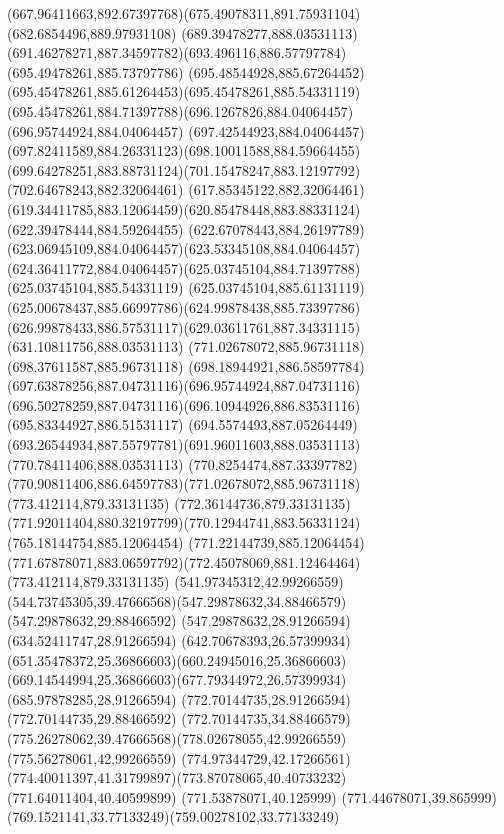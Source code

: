 {{\curveto(667.96411663,892.67397768)(675.49078311,891.75931104)(682.6854496,889.97931108)
\moveto(689.39478277,888.03531113)
\curveto(691.46278271,887.34597782)(693.496116,886.57797784)(695.49478261,885.73797786)
\curveto(695.48544928,885.67264452)(695.45478261,885.61264453)(695.45478261,885.54331119)
\curveto(695.45478261,884.71397788)(696.1267826,884.04064457)(696.95744924,884.04064457)
\curveto(697.42544923,884.04064457)(697.82411589,884.26331123)(698.10011588,884.59664455)
\curveto(699.64278251,883.88731124)(701.15478247,883.12197792)(702.64678243,882.32064461)
\lineto(617.85345122,882.32064461)
\curveto(619.34411785,883.12064459)(620.85478448,883.88331124)(622.39478444,884.59264455)
\curveto(622.67078443,884.26197789)(623.06945109,884.04064457)(623.53345108,884.04064457)
\curveto(624.36411772,884.04064457)(625.03745104,884.71397788)(625.03745104,885.54331119)
\curveto(625.03745104,885.61131119)(625.00678437,885.66997786)(624.99878438,885.73397786)
\curveto(626.99878433,886.57531117)(629.03611761,887.34331115)(631.10811756,888.03531113)
\closepath
\moveto(771.02678072,885.96731118)
\lineto(698.37611587,885.96731118)
\curveto(698.18944921,886.58597784)(697.63878256,887.04731116)(696.95744924,887.04731116)
\curveto(696.50278259,887.04731116)(696.10944926,886.83531116)(695.83344927,886.51531117)
\curveto(694.5574493,887.05264449)(693.26544934,887.55797781)(691.96011603,888.03531113)
\lineto(770.78411406,888.03531113)
\curveto(770.8254474,887.33397782)(770.90811406,886.64597783)(771.02678072,885.96731118)
\moveto(773.412114,879.33131135)
\lineto(772.36144736,879.33131135)
\curveto(771.92011404,880.32197799)(770.12944741,883.56331124)(765.18144754,885.12064454)
\lineto(771.22144739,885.12064454)
\curveto(771.67878071,883.06597792)(772.45078069,881.12464464)(773.412114,879.33131135)
\moveto(541.97345312,42.99266559)
\curveto(544.73745305,39.47666568)(547.29878632,34.88466579)(547.29878632,29.88466592)
\lineto(547.29878632,28.91266594)
\lineto(634.52411747,28.91266594)
\curveto(642.70678393,26.57399934)(651.35478372,25.36866603)(660.24945016,25.36866603)
\curveto(669.14544994,25.36866603)(677.79344972,26.57399934)(685.97878285,28.91266594)
\lineto(772.70144735,28.91266594)
\lineto(772.70144735,29.88466592)
\curveto(772.70144735,34.88466579)(775.26278062,39.47666568)(778.02678055,42.99266559)
\lineto(775.56278061,42.99266559)
\curveto(774.97344729,42.17266561)(774.40011397,41.31799897)(773.87078065,40.40733232)
\lineto(771.64011404,40.40599899)
\lineto(771.53878071,40.125999)
\curveto(771.44678071,39.865999)(769.1521141,33.77133249)(759.00278102,33.77133249)
}}
